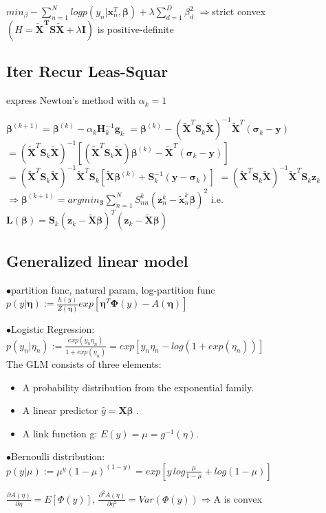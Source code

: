 \documentclass[10pt,a4paper,landscape]{article}
\renewcommand{\bf}[1]{\ensuremath{\mathbf{#1}}}
\newcommand{\bbeta}{\boldsymbol\beta}
\begin{document}
\begin{multicols*}{6}
$min_\beta-\sum_{n=1}^Nlogp(y_n|\bf{x}_n^T, \bbeta) + \lambda \sum_{d=1}^D \beta_d^2$
$\Rightarrow $strict convex$(H=\bf{\tilde{X}^TS\tilde{X}}+\lambda\bf{I})$ is positive-definite

\subsection{Iter Recur Leas-Squar}
express Newton's method with $\alpha_k=1$

$\bbeta^{(k+1)} = \bbeta^{(k)}-\alpha_k\bf{H}_k^{-1}\bf{g}_k$
$=\bbeta^{(k)}-(\tilde{\bf{X}}^T\bf{S}_k\bf{\tilde{X}})^{-1}\bf{\tilde{X}}^T(\boldsymbol\sigma_k-\bf{y})$
$=(\tilde{\bf{X}}^T\bf{S}_k\bf{\tilde{X}})^{-1}[(\tilde{\bf{X}}^T\bf{S}_k\bf{\tilde{X}})\bbeta^{(k)}-\bf{\tilde{X}}^T(\boldsymbol\sigma_k-\bf{y})]$
$=(\tilde{\bf{X}}^T\bf{S}_k\bf{\tilde{X}})^{-1}\bf{\tilde{X}}^T\bf{S}_k[\tilde{\bf{X}}\bbeta^{(k)}+\bf{S}_k^{-1}(\bf{y}-\boldsymbol\sigma_k)]$
$=(\tilde{\bf{X}}^T\bf{S}_k\bf{\tilde{X}})^{-1}\bf{\tilde{X}}^T\bf{S}_k\bf{z}_k$
$\Longrightarrow \bbeta^{(k+1)} = argmin_{\bbeta}\sum_{n=1}^NS_{nn}^k(\bf{z}_n^k-\tilde{\bf{x}}_n^k\bbeta)^2$
i.e.$\mathcal{\bf{L}}(\bbeta)= \bf{S}_k(\bf{z}_k-\tilde{\bf{X}}\bbeta)^T(\bf{z}_k-\tilde{\bf{X}}\bbeta)$


\subsection{Generalized linear model}
$\bullet$partition func, natural param, log-partition func
$p(y|\boldsymbol\eta):=\frac{h(y)}{Z(\boldsymbol\eta)}exp[\boldsymbol\eta^T\boldsymbol\Phi(y)-A(\boldsymbol\eta)]$

$\bullet$Logistic Regression: $p(y_n|\eta_n):=\frac{exp(y_n\eta_n)}{1+exp(\eta_n)}=exp[y_n\eta_n-log(1+exp(\eta_n))]$\\

The GLM consists of three elements:
\begin{itemize}
  \item A probability distribution from the exponential family.
  \item A linear predictor $\hat y = \bf{X} \bbeta$ .
  \item A link function g: $E(y) = \mu = g^{-1}(\eta)$.
\end{itemize}

$\bullet$Bernoulli distribution: $p(y|\mu):=\mu^y(1-\mu)^{(1-y)}=exp[y\,log\frac{\mu}{1-\mu}+log(1-\mu)]$

$\frac{\partial A(\eta)}{\partial \eta}=E[\Phi(y)] ,\, \frac{\partial ^2A(\eta)}{\partial \eta^2}=Var(\Phi(y))\Rightarrow$A is convex


\end{multicols*}
\end{document}
